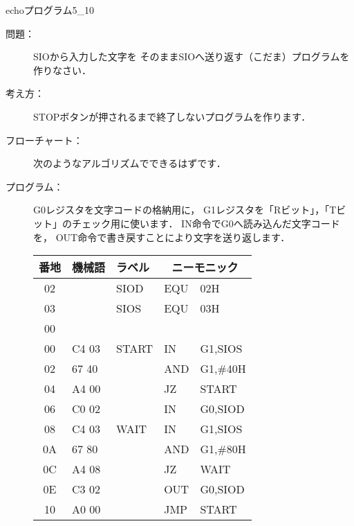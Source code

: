 \newpage
\begin{reidai}{echoプログラム}{5_10}
\begin{description}
\item[問題：] SIOから入力した文字を
そのままSIOへ送り返す（こだま）プログラムを作りなさい．

\item[考え方：]
STOPボタンが押されるまで終了しないプログラムを作ります．
\item[フローチャート：]
次のようなアルゴリズムでできるはずです．

\begin{center}
\end{center}

\item[プログラム：]
G0レジスタを文字コードの格納用に，
G1レジスタを「Rビット」，「Tビット」のチェック用に使います．
IN命令でG0へ読み込んだ文字コードを，
OUT命令で書き戻すことにより文字を送り返します．

{\tt\footnotesize\begin{center}
\begin{tabular}{|c|l|l|l l|} \hline
番地 & 機械語 & ラベル & \multicolumn{2}{|c|}{ニーモニック} \\
\hline
02 &       & SIOD  & EQU & 02H            \\
03 &       & SIOS  & EQU & 03H            \\
00 &       &       &     &                \\
00 & C4 03 & START & IN  & G1,SIOS        \\
02 & 67 40 &       & AND & G1,\#40H       \\
04 & A4 00 &       & JZ  & START          \\
06 & C0 02 &       & IN  & G0,SIOD        \\
08 & C4 03 & WAIT  & IN  & G1,SIOS        \\
0A & 67 80 &       & AND & G1,\#80H       \\
0C & A4 08 &       & JZ  & WAIT           \\
0E & C3 02 &       & OUT & G0,SIOD        \\
10 & A0 00 &       & JMP & START          \\
\hline
\end{tabular}
\end{center}}
\end{description}
\end{reidai}

